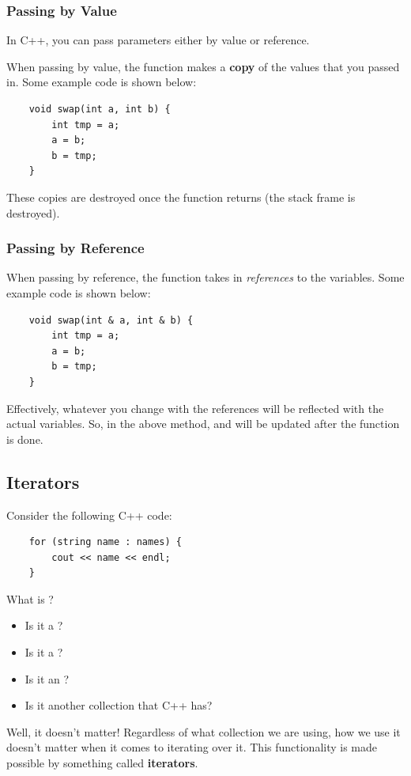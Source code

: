 \documentclass[letterpaper]{article}
\begin{document}
\subsubsection{Passing by Value}
In C++, you can pass parameters either by value or reference. 

\bigskip

When passing by value, the function makes a \textbf{copy} of the values that you passed in. Some example code is shown below:
\begin{verbatim}
    void swap(int a, int b) {
        int tmp = a;
        a = b;
        b = tmp;
    }
\end{verbatim}
These copies are destroyed once the function returns (the stack frame is destroyed). 

\subsubsection{Passing by Reference}
When passing by reference, the function takes in \emph{references} to the variables. Some example code is shown below:
\begin{verbatim}
    void swap(int & a, int & b) {
        int tmp = a;
        a = b;
        b = tmp;
    }
\end{verbatim}
Effectively, whatever you change with the references will be reflected with the actual variables. So, in the above  method,  and  will be updated after the function is done. 

\subsection{Iterators}
Consider the following C++ code: 
\begin{verbatim}
    for (string name : names) {
        cout << name << endl; 
    }
\end{verbatim}
What is ? 
\begin{itemize}
    \item Is it a ? 
    \item Is it a ? 
    \item Is it an ?
    \item Is it another collection that C++ has? 
\end{itemize}
Well, it doesn't matter! Regardless of what collection we are using, how we use it doesn't matter when it comes to iterating over it. This functionality is made possible by something called \textbf{iterators}.
\end{document}

